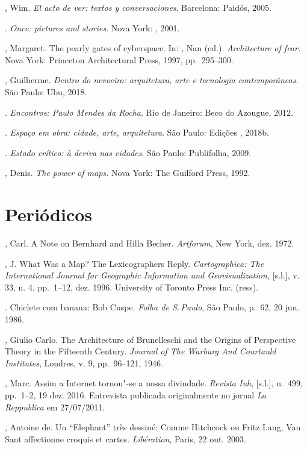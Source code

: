 \begin{bibliohedra}
, Wim. \emph{El acto de ver: textos y conversaciones}.
Barcelona: Paidós, 2005.

\tit{\_\_\_\_\_\_}. \emph{Once: pictures and stories}. Nova York:
, 2001.

, Margaret. The pearly gates of cyberspace. In: , Nan
(ed.). \emph{Architecture of fear.} Nova York: Princeton Architectural
Press, 1997, pp.~295--300.

, Guilherme. \emph{Dentro do nevoeiro: arquitetura, arte e
tecnologia contemporâneas}. São Paulo: Ubu, 2018.

. \emph{Encontros: Paulo Mendes da Rocha.} Rio de
Janeiro: Beco do Azougue, 2012.

\tit{\_\_\_\_\_\_}. \emph{Espaço em obra: cidade, arte, arquitetura}. São Paulo: Edições , 2018b.

\tit{\_\_\_\_\_\_}. \emph{Estado crítico: à deriva nas cidades}. São
Paulo: Publifolha, 2009.


, Denis. \emph{The power of maps.} Nova York: The Guilford Press,
1992.

\section{Periódicos}

, Carl. A Note on Bernhard and Hilla Becher. \emph{Artforum}, New
York, dez. 1972.

, J. What Was a Map? The Lexicographers Reply.
\emph{Cartographica: The International Journal for Geographic
Information and Geovisualization,} {[}s.l.{]}, v. 33, n. 4, pp.~1--12, dez.
1996. University of Toronto Press Inc. (ress).

. Chiclete com banana: Bob Cuspe. \emph{Folha de S.\,Paulo}, São
Paulo, p.~62, 20 jun. 1986.

, Giulio Carlo. The Architecture of Brunelleschi and the Origins of
Perspective Theory in the Fifteenth Century. \emph{Journal of The
Warburg And Courtauld Institutes}, Londres, v. 9, pp.~96--121, 1946.

, Marc. Assim a Internet tornou"-se a nossa divindade.
\emph{Revista Iuh}, {[}s.l.{]}, n.~499, pp.~1--2, 19 dez. 2016.
Entrevista publicada originalmente no jornal \emph{La Reppublica} em
27/07/2011. 

, Antoine de. Un ``Elephant'' très dessiné: Comme Hitchcock ou
Fritz Lang, Van Sant affectionne croquis et
cartes. \emph{Libération}, Paris, 22 out. 2003.


\end{bibliohedra}
